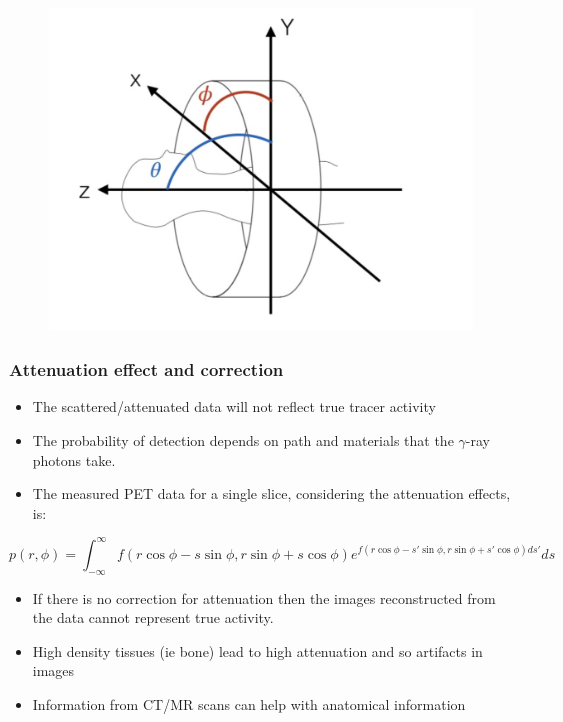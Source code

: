 \documentclass{article}
\begin{document}
\begin{figure}{\linewidth}
	\centering
	\includegraphics[width = \linewidth]{Tsai's Thesis Analysis/3D Coordinate system for PET.png}
    \caption{\label{3D Coordinate system PET}}
\end{figure}
\subsubsection{Attenuation effect and correction}
\begin{itemize}
\item The scattered/attenuated data will not reflect true tracer activity
\item The probability of detection depends on path and materials that the $\gamma$-ray photons take. 
\item The measured PET data for a single slice, considering the attenuation effects, is:
\end{itemize}
\[ 
p(r,\phi) = 
\int_{-\infty} ^{\infty} 
    f(r\cos\phi - s\sin\phi, r\sin\phi + s\cos\phi) 
e^{
    f(r\cos\phi - s'\sin\phi, r\sin\phi + s'\cos\phi)ds'
}ds
\]
\begin{itemize}
\begin{itemize}
\item If there is no correction for attenuation then the images reconstructed from the data cannot represent true activity.
\item High density tissues (ie bone) lead to high attenuation and so artifacts in images
\item Information from CT/MR scans can help with anatomical information
\end{itemize}
\end{itemize}
\end{document}
